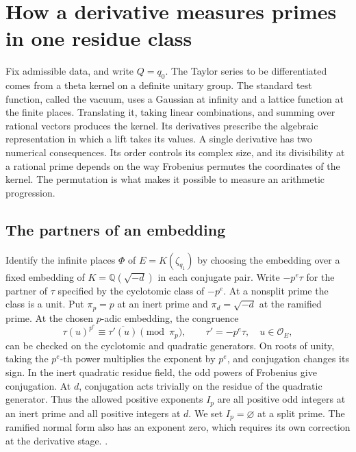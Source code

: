 \section{How a derivative measures primes in one residue class}\label{sec:bridge-jets}

Fix admissible data, and write \(Q=q_0\). The Taylor series to be differentiated comes from a theta kernel on a definite unitary group. The standard test function, called the vacuum, uses a Gaussian at infinity and a lattice function at the finite places. Translating it, taking linear combinations, and summing over rational vectors produces the kernel. Its derivatives prescribe the algebraic representation in which a lift takes its values. A single derivative has two numerical consequences. Its order controls its complex size, and its divisibility at a rational prime depends on the way Frobenius permutes the coordinates of the kernel. The permutation is what makes it possible to measure an arithmetic progression.

\subsection{The partners of an embedding}

Identify the infinite places \(\Phi\) of \(E=K(\zeta_{q_1})\) by choosing the embedding over a fixed embedding of \(K=\mathbb Q(\sqrt{-d})\) in each conjugate pair. Write \(-p^e\tau\) for the partner of \(\tau\) specified by the cyclotomic class of \(-p^e\). At a nonsplit prime the class is a unit. Put \(\pi_p=p\) at an inert prime and \(\pi_d=\sqrt{-d}\) at the ramified prime. At the chosen \(p\)-adic embedding, the congruence
\[
     \tau(u)^{p^e}\equiv\overline{\tau'(u)}\pmod{\pi_p},
     \qquad \tau'=-p^e\tau,\quad u\in\mathcal O_E ,
\]
can be checked on the cyclotomic and quadratic generators. On roots of unity, taking the \(p^e\)-th power multiplies the exponent by \(p^e\), and conjugation changes its sign. In the inert quadratic residue field, the odd powers of Frobenius give conjugation. At \(d\), conjugation acts trivially on the residue of the quadratic generator. Thus the allowed positive exponents \(I_p\) are all positive odd integers at an inert prime and all positive integers at \(d\). We set \(I_p=\varnothing\) at a split prime. The ramified normal form also has an exponent zero, which requires its own correction at the derivative stage. .

